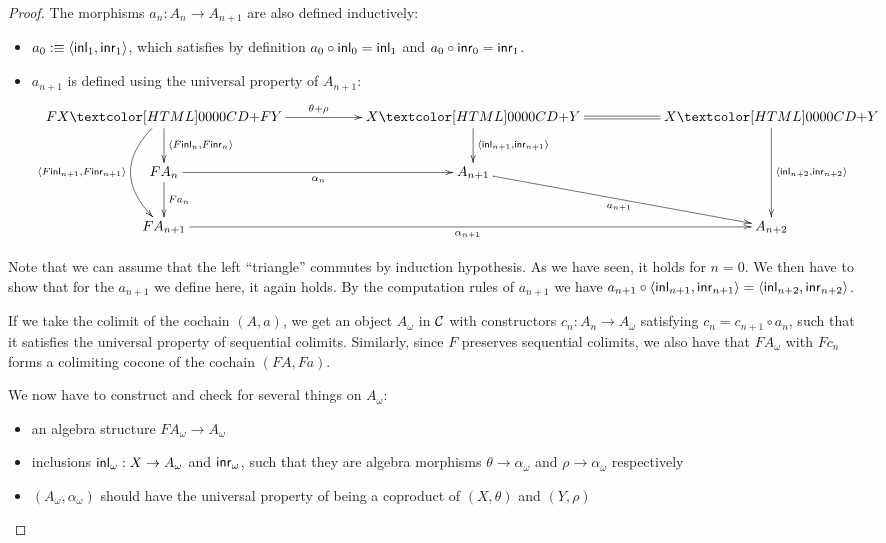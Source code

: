 \begin{proof}
  The morphisms $a_n : A_n \to A_{n+1}$ are also defined inductively:
  \begin{itemize}
  \item $a_0 \ddefeq \langle \inln{1}, \inrn{1} \rangle$, which
    satisfies by definition $a_0 \circ \inln{0} = \inln{1}$ and
    $a_0 \circ \inrn{0} = \inrn{1}$.
  \item $a_{n+1}$ is defined using the universal property of
    $A_{n+1}$:
    $$
    \xymatrix{
      \coproduct{FX}{FY} \ar[rr]^{\theta + \rho} \ar[d]^{\langle F \inln{n} , F \inrn{n} \rangle} 
      \ar@/_2pc/[dd]_{\langle F \inln{n+1} , F \inrn{n+1} \rangle}
      &&\coproduct{X}{Y} \ar[d]^{\langle \inln{n+1} , \inrn{n+1} \rangle} \ar@{=}[rr]
      &&\coproduct{X}{Y} \ar[dd]^{\langle \inln{n+2} , \inrn{n+2} \rangle} \\
      FA_n \ar[rr]_{\alpha_n} \ar[d]^{F a_n}
      &&A_{n+1} \ar[drr]_{a_{n+1}}
      \\
      FA_{n+1} \ar[rrrr]_{\alpha_{n+1}}
      &&&&A_{n+2}
    }
    $$
  \end{itemize}
  Note that we can assume that the left ``triangle'' commutes by
  induction hypothesis. As we have seen, it holds for $n = 0$. We then
  have to show that for the $a_{n+1}$ we define here, it again
  holds. By the computation rules of $a_{n+1}$ we have
  $a_{n+1} \circ \langle \inln{n+1} , \inrn{n+1} \rangle = \langle
  \inln{n+2} , \inrn{n+2} \rangle$.

  If we take the colimit of the cochain $(A,a)$, we get an object
  $A_{\omega}$ in $\mathcal{C}$ with constructors $c_n : A_n \to A_{\omega}$
  satisfying $c_n = c_{n+1} \circ a_n$, such that it satisfies the
  universal property of sequential colimits. Similarly, since $F$
  preserves sequential colimits, we also have that $FA_{\omega}$ with
  $Fc_n$ forms a colimiting cocone of the cochain $(FA,Fa)$.

  We now have to construct and check for several things on $A_{\omega}$:
  \begin{itemize}
  \item an algebra structure $F A_{\omega} \to A_{\omega}$
  \item inclusions $\inln{\omega} : X \to A_{\omega}$ and
    $\inrn{\omega}$, such that they are algebra morphisms
    $\theta \to \alpha_{\omega}$ and $\rho \to \alpha_{\omega}$
    respectively
  \item $(A_{\omega} , \alpha_{\omega})$ should have the universal
    property of being a coproduct of $(X,\theta)$ and $(Y,\rho)$
  \end{itemize}



\end{proof}
